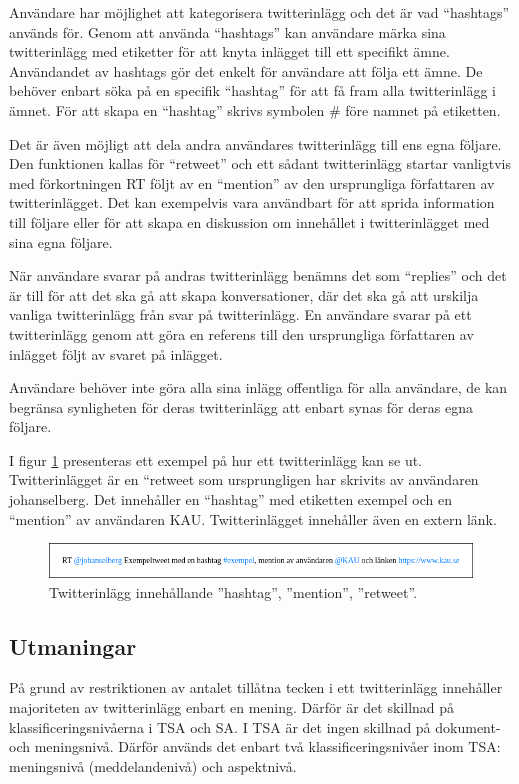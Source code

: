 \documentclass{kaumasters} %
\begin{document}
Användare har möjlighet att kategorisera twitterinlägg och det är vad “hashtags” används för. Genom att använda “hashtags” kan användare märka sina twitterinlägg med etiketter för att knyta inlägget till ett specifikt ämne. Användandet av hashtags gör det enkelt för användare att följa ett ämne. De behöver enbart söka på en specifik “hashtag” för att få fram alla twitterinlägg i ämnet. För att skapa en “hashtag” skrivs symbolen \# före namnet på etiketten.

Det är även möjligt att dela andra användares twitterinlägg till ens egna följare. Den funktionen kallas för “retweet” och ett sådant twitterinlägg startar vanligtvis med förkortningen RT följt av en “mention” av den ursprungliga författaren av twitterinlägget. Det kan exempelvis vara användbart för att sprida information till följare eller för att skapa en diskussion om innehållet i twitterinlägget med sina egna följare. 

När användare svarar på andras twitterinlägg benämns det som “replies” och det är till för att det ska gå att skapa konversationer, där det ska gå att urskilja vanliga twitterinlägg från svar på twitterinlägg. En användare svarar på ett twitterinlägg genom att göra en referens till den ursprungliga författaren av inlägget följt av svaret på inlägget.

Användare behöver inte göra alla sina inlägg offentliga för alla användare, de kan begränsa synligheten för deras twitterinlägg att enbart synas för deras egna följare. 

I figur \ref{fig:tweet} presenteras ett exempel på hur ett twitterinlägg kan se ut. Twitterinlägget är en “retweet som ursprungligen har skrivits av användaren johanselberg. Det innehåller en “hashtag” med etiketten exempel och en “mention” av användaren KAU. Twitterinlägget innehåller även en extern länk.

\begin{figure}[h]
\includegraphics[width=12cm]{exempeltweet}
\centering
\caption{Twitterinlägg innehållande ''hashtag'', ''mention'', ''retweet''.}
\label{fig:tweet}
\end{figure}

\subsection{Utmaningar} \label{TSAchall}
På grund av restriktionen av antalet tillåtna tecken i ett twitterinlägg innehåller majoriteten av twitterinlägg enbart en mening. Därför är det skillnad på klassificeringsnivåerna i TSA och SA. I TSA är det ingen skillnad på dokument- och meningsnivå. Därför används det enbart två klassificeringsnivåer inom TSA: meningsnivå (meddelandenivå) och aspektnivå. \cite{TSAsurvey}
\end{document}
